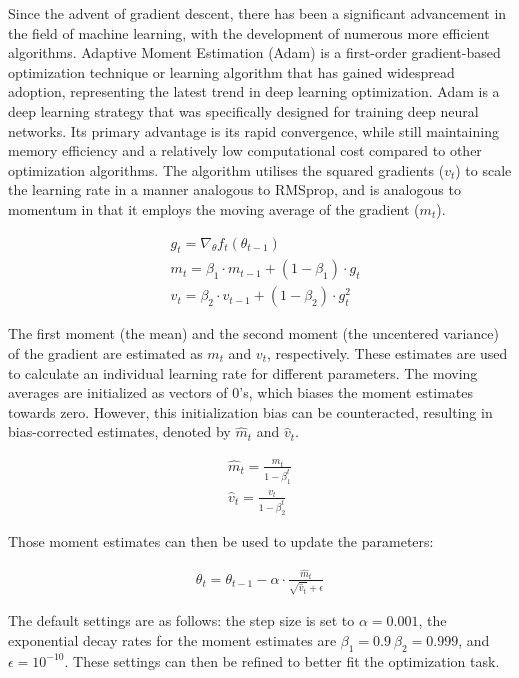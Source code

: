 \documentclass[
a4paper, 
12pt,
grayscalebody, %
abstract=on,
twoside, BCOR10mm, 12pt, DIV13,headinclude, footexclude, final, abstracton, openright
]{ibireprt}
\numberwithin{equation}{chapter}
\numberwithin{table}{chapter}
\numberwithin{figure}{chapter}
\numberwithin{algorithm}{chapter}
\numberwithin{example}{chapter}
\numberwithin{example}{chapter}
\begin{document}
Since the advent of gradient descent, there has been a significant advancement in the field of machine learning, with the development of numerous more efficient algorithms. Adaptive Moment Estimation (Adam) \citet{Kingma2014} is a first-order gradient-based optimization technique or learning algorithm that has gained widespread adoption, representing the latest trend in deep learning optimization. Adam is a deep learning strategy that was specifically designed for training deep neural networks. Its primary advantage is its rapid convergence, while still maintaining memory efficiency and a relatively low computational cost compared to other optimization algorithms. 
The algorithm utilises the squared gradients ($v_t$) to scale the learning rate in a manner analogous to RMSprop, and is analogous to momentum in that it employs the moving average of the gradient ($m_t$).


\begin{align}
	& g_t = \nabla_\theta f_t(\theta_{t-1})\\
	& m_t =\beta_1\cdot m_{t-1} + (1- \beta_1)\cdot g_t \\
	& v_t =\beta_2\cdot v_{t-1} + (1- \beta_2)\cdot g_t^2
\end{align}

The first moment (the mean) and the second moment (the uncentered variance) of the gradient are estimated as $m_t$ and $v_t$, respectively. These estimates are used to calculate an individual learning rate for different parameters. The moving averages are initialized as vectors of 0's, which biases the moment estimates towards zero. However, this initialization bias can be counteracted, resulting in bias-corrected estimates, denoted by $\hat{m}_t$ and $\hat{v}_t$.

\begin{align}
	\hat{m}_t =\frac{m_t}{1- \beta_1^t} \\
	\hat{v}_t = \frac{v_t}{1- \beta_2^t}
\end{align}

Those moment estimates can then be used to update the parameters: 

\begin{align}
	\theta_t = \theta_{t-1}-\alpha\cdot\frac{\hat{m}_t}{\sqrt{\hat{v}_t}+\epsilon}
\end{align}

The default settings are as follows: the step size is set to $\alpha = 0.001$, the exponential decay rates for the moment estimates are $\beta_1 = 0.9\ \beta_2 = 0.999$, and $\epsilon =  10^{-10}$. These settings can then be refined to better fit the optimization task.
\end{document}
